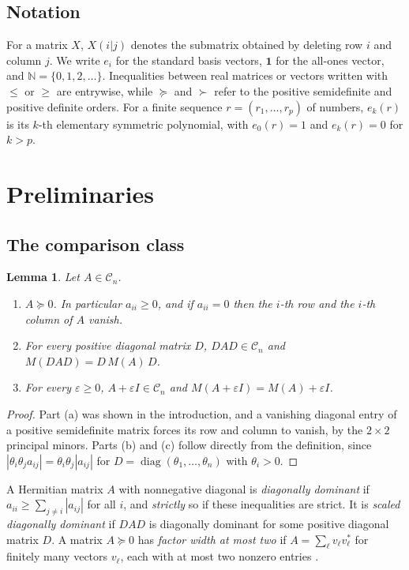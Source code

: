 \documentclass[11pt]{amsart}
\newtheorem{lemma}[theorem]{Lemma}
\theoremstyle{remark}
\numberwithin{equation}{section}
\newcommand{\diag}{\operatorname{diag}}
\newcommand{\cC}{\mathcal{C}}
\newcommand{\N}{\mathbb{N}}
\begin{document}
\subsection*{Notation}
For a matrix $X$, $X(i|j)$ denotes the submatrix obtained by deleting row $i$ and column $j$. We write $e_i$ for the standard basis vectors, $\mathbf{1}$ for the all-ones vector, and $\N=\{0,1,2,\dots\}$. Inequalities between real matrices or vectors written with $\le$ or $\ge$ are entrywise, while $\succeq$ and $\succ$ refer to the positive semidefinite and positive definite orders. For a finite sequence $r=(r_1,\dots,r_p)$ of numbers, $e_k(r)$ is its $k$-th elementary symmetric polynomial, with $e_0(r)=1$ and $e_k(r)=0$ for $k>p$.

\section{Preliminaries}\label{sec:prelim}

\subsection{The comparison class}\label{subsec:class}

\begin{lemma}\label{lem:class}
Let $A\in\cC_n$.
\begin{enumerate}
\item[(a)] $A\succeq0$. In particular $a_{ii}\ge0$, and if $a_{ii}=0$ then the $i$-th row and the $i$-th column of $A$ vanish.
\item[(b)] For every positive diagonal matrix $D$, $DAD\in\cC_n$ and $M(DAD)=D\,M(A)\,D$.
\item[(c)] For every $\varepsilon\ge0$, $A+\varepsilon I\in\cC_n$ and $M(A+\varepsilon I)=M(A)+\varepsilon I$.
\end{enumerate}
\end{lemma}

\begin{proof}
Part (a) was shown in the introduction, and a vanishing diagonal entry of a positive semidefinite matrix forces its row and column to vanish, by the $2\times2$ principal minors. Parts (b) and (c) follow directly from the definition, since $|\theta_i\theta_ja_{ij}|=\theta_i\theta_j|a_{ij}|$ for $D=\diag(\theta_1,\dots,\theta_n)$ with $\theta_i>0$.
\end{proof}

A Hermitian matrix $A$ with nonnegative diagonal is \emph{diagonally dominant} if $a_{ii}\ge\sum_{j\ne i}|a_{ij}|$ for all $i$, and \emph{strictly} so if these inequalities are strict. It is \emph{scaled diagonally dominant} if $DAD$ is diagonally dominant for some positive diagonal matrix $D$. A matrix $A\succeq0$ has \emph{factor width at most two} if $A=\sum_\ell v_\ell v_\ell^*$ for finitely many vectors $v_\ell$, each with at most two nonzero entries \cite{BCPT,SN}.
\end{document}
